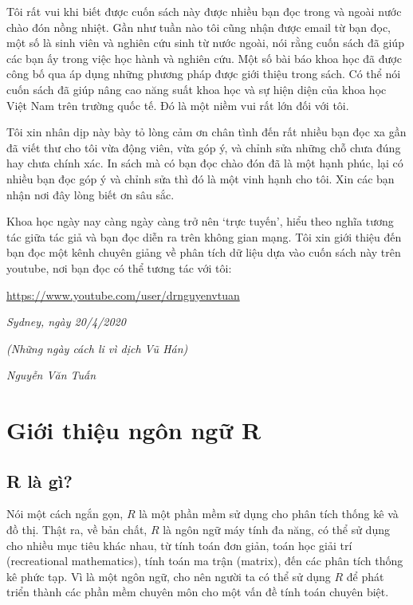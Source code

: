 \documentclass[
]{book}
\begin{document}
Tôi rất vui khi biết được cuốn sách này được nhiều bạn đọc trong và ngoài nước chào đón nồng nhiệt. Gần như tuần nào tôi cũng nhận được email từ bạn đọc, một số là sinh viên và nghiên cứu sinh từ nước ngoài, nói rằng cuốn sách đã giúp các bạn ấy trong việc học hành và nghiên cứu. Một số bài báo khoa học đã được công bố qua áp dụng những phương pháp được giới thiệu trong sách. Có thể nói cuốn sách đã giúp nâng cao năng suất khoa học và sự hiện diện của khoa học Việt Nam trên trường quốc tế. Đó là một niềm vui rất lớn đối với tôi.

Tôi xin nhân dịp này bày tỏ lòng cảm ơn chân tình đến rất nhiều bạn đọc xa gần đã viết thư cho tôi vừa động viên, vừa góp ý, và chỉnh sửa những chỗ chưa đúng hay chưa chính xác. In sách mà có bạn đọc chào đón đã là một hạnh phúc, lại có nhiều bạn đọc góp ý và chỉnh sửa thì đó là một vinh hạnh cho tôi. Xin các bạn nhận nơi đây lòng biết ơn sâu sắc.

Khoa học ngày nay càng ngày càng trở nên `trực tuyến', hiểu theo nghĩa tương tác giữa tác giả và bạn đọc diễn ra trên không gian mạng. Tôi xin giới thiệu đến bạn đọc một kênh chuyên giảng về phân tích dữ liệu dựa vào cuốn sách này trên youtube, nơi bạn đọc có thể tương tác với tôi:

\url{https://www.youtube.com/user/drnguyenvtuan}

\emph{Sydney, ngày 20/4/2020}

\emph{(Những ngày cách li vì dịch Vũ Hán)}

\emph{Nguyễn Văn Tuấn}

\mainmatter

\hypertarget{Gioi-thieu-ngon-ngu-R}{%
\chapter{Giới thiệu ngôn ngữ R}\label{Gioi-thieu-ngon-ngu-R}}

\hypertarget{r-luxe0-guxec}{%
\section{R là gì?}\label{r-luxe0-guxec}}

Nói một cách ngắn gọn, \(R\) là một phần mềm sử dụng cho phân tích thống kê và đồ thị. Thật ra, về bản chất, \(R\) là ngôn ngữ máy tính đa năng, có thể sử dụng cho nhiều mục tiêu khác nhau, từ tính toán đơn giản, toán học giải trí (recreational mathematics), tính toán ma trận (matrix), đến các phân tích thống kê phức tạp. Vì là một ngôn ngữ, cho nên người ta có thể sử dụng \(R\) để phát triển thành các phần mềm chuyên môn cho một vấn đề tính toán chuyên biệt.
\end{document}
